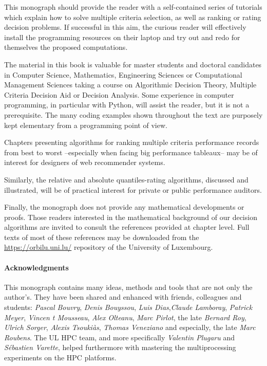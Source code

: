 
This monograph should provide the reader with a self-contained series of tutorials which explain how to solve multiple criteria selection, as well as ranking or rating decision problems. If successful in this aim, the curious reader will effectively install the \Digraph programming resources on their laptop and try out and redo for themselves the proposed computations.


The material in this book is valuable for master students and doctoral candidates in Computer Science, Mathematics, Engineering Sciences or Computational Management Sciences taking a course on Algorithmic Decision Theory, Multiple Criteria Decision Aid or Decision Analysis. Some experience in computer programming, in particular with Python, will assist the reader, but it is not a prerequisite. The many coding examples shown throughout the text are purposely kept elementary from a programming point of view. 

Chapters presenting algorithms for ranking multiple criteria performance records from best to worst --especially when facing big performance tableaux-- may be of interest for designers of web recommender systems. 

Similarly, the relative and absolute quantiles-rating algorithms, discussed and illustrated, will be of practical interest for private or public performance auditors.

Finally, the monograph does not provide any mathematical developments or proofs. Those readers interested in the mathematical background of our decision algorithms are invited to consult the references provided at chapter level. Full texts of most of these references may be downloaded from the \href{https://orbilu.uni.lu/}{https://orbilu.uni.lu/} repository of the University of Luxembourg. 

\pagebreak

\paragraph{Acknowledgments}

This monograph contains many ideas, methods and tools that are not only the author’s. They have been shared and enhanced with friends, colleagues and students: \emph{Pascal Bouvry}, \emph{Denis Bouyssou}, \emph{Luis Dias},\emph{Claude Lamboray}, \emph{Patrick Meyer}, \emph{Vincen t Mousseau}, \emph{Alex Olteanu}, \emph{Marc Pirlot}, the late \emph{Bernard Roy}, \emph{Ulrich Sorger}, \emph{Alexis Tsouki\`as}, \emph{Thomas Veneziano} and especially, the late \emph{Marc Roubens}. The UL HPC team, and more specifically \emph{Valentin Plugaru} and \emph{Sébastien Varette}, helped furthermore with mastering the multiprocessing experiments on the HPC platforms. 

